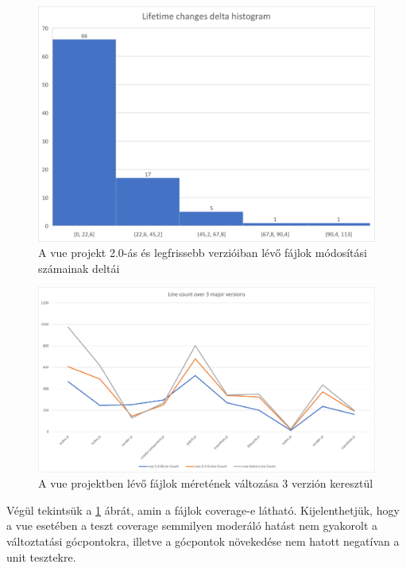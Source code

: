\begin{figure}[H]
    \centering
    \includegraphics[width=1\textwidth]{images/vue/vue-all-lifetime-changes-delta-hist.png}
    \caption{A vue projekt 2.0-ás és legfrissebb verzióiban lévő fájlok módosítási számainak deltái}
    \label{fig:vue-all-delta-hist}
\end{figure}

\begin{figure}[H]
    \centering
    \includegraphics[width=1\textwidth]{images/vue/vue-all-line-count.png}
    \caption{A vue projektben lévő fájlok méretének változása 3 verzión keresztül}
    \label{fig:vue-all-line-count}
\end{figure}

Végül tekintsük a \ref{fig:vue-all-delta-hist} ábrát, amin a fájlok coverage-e látható. Kijelenthetjük, hogy a vue esetében a teszt coverage semmilyen moderáló hatást nem gyakorolt a változtatási gócpontokra, illetve a gócpontok növekedése nem hatott negatívan a unit tesztekre.

